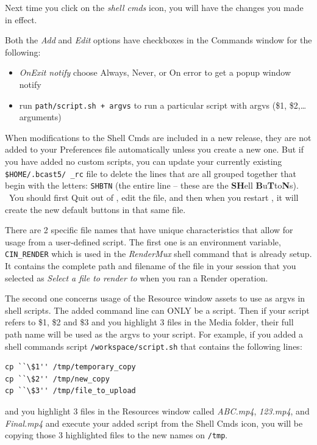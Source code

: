 Next time you click on the \textit{shell cmds} icon, you will have the changes you made in effect.

Both the \textit{Add} and \textit{Edit} options have checkboxes in the Commands window for the following:

\begin{itemize}[nosep]
	\item \textit{OnExit notify} \quad  choose Always, Never, or On error to get a popup window notify
	\item run \texttt{path/script.sh + argvs} \quad to run a particular script with argvs (\$1, \$2,{\dots} arguments)
\end{itemize}


When modifications to the Shell Cmds are included in a new \CGG{} release, they are not added to your Preferences file automatically unless you create a new one. But if you have added no custom scripts, you can update your currently existing \texttt{\$HOME/.bcast5/ \CGG{}\_rc} file to delete the lines that are all grouped together that begin with the letters: \texttt{SHBTN} (the entire line -- these are the \textbf{SH}ell \textbf{B}u\textbf{T}to\textbf{N}s). \ You should first Quit out of \CGG{}, edit the file, and then when you restart \CGG{}, it will create the new default buttons in that same file.

There are 2 specific \CGG{} file names that have unique characteristics that allow for usage from a user-defined
script. The first one is an environment variable, \texttt{CIN\_RENDER} which is used in the \textit{RenderMux} shell command that is already setup. It contains the complete path and filename of the file in your session that you selected as \textit{Select a file to render to} when you ran a Render operation.

The second one concerns usage of the Resource window assets to use as argvs in shell scripts. The added command line
can ONLY be a script. Then if your script refers to \$1, \$2 and \$3 and you highlight 3 files in the Media folder,
their full path name will be used as the argvs to your script. For example, if you added a shell commands script
\texttt{/workspace/script.sh} that contains the following lines:

\begin{lstlisting}[numbers=none,xleftmargin=10mm]
cp ``\$1'' /tmp/temporary_copy
cp ``\$2'' /tmp/new_copy
cp ``\$3'' /tmp/file_to_upload
\end{lstlisting}

and you highlight 3 files in the Resources window called\textit{ ABC.mp4}, \textit{123.mp4}, and \textit{Final.mp4} and execute your added script from the Shell Cmds icon, you will be copying those 3 highlighted files to the new names on \texttt{/tmp}.

